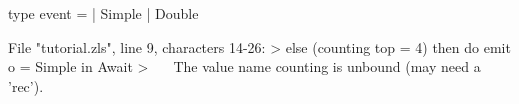 \runverbatimfalse
{}
\begin{RunVerbatimMsg}
type event   =  | Simple  | Double
\end{RunVerbatimMsg}
\begin{RunVerbatimErr}
File "tutorial.zls", line 9, characters 14-26:
>        else (counting top = 4) then do emit o = Simple in Await
>              ^^^^^^^^^^^^
The value name counting is unbound (may need a 'rec').
\end{RunVerbatimErr}
